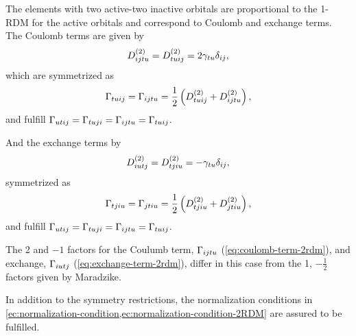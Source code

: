 The elements with two active-two inactive orbitals are proportional to the
1-RDM for the active orbitals and correspond to Coulomb and exchange terms.
The Coulomb terms are given by
\begin{equation} \label{eq:coulomb-term-2rdm}
    D^{\left( 2 \right)}_{ijtu} = D^{\left( 2 \right)}_{tuij} = 2 \gamma_{tu} \delta_{ij},
\end{equation}
which are symmetrized as 
\begin{equation}
    \Gamma_{tuij} = \Gamma_{ijtu} =
    \frac{1}{2} \left( D^{\left( 2 \right)}_{tuij} + D^{\left( 2 \right)}_{ijtu} \right)
    ,
\end{equation}
and fulfill
$\Gamma_{utij} = \Gamma_{tuji} = \Gamma_{ijtu} = \Gamma_{tuij}$.

And the exchange terms by
\begin{equation} \label{eq:exchange-term-2rdm}
    D^{\left( 2 \right)}_{iutj} = D^{\left( 2 \right)}_{tjiu} = - \gamma_{tu} \delta_{ij}
    ,
\end{equation}
symmetrized as
\begin{equation}
    \Gamma_{tjiu} = \Gamma_{jtiu} =
    \frac{1}{2} \left( D^{\left( 2 \right)}_{tjiu} + D^{\left( 2 \right)}_{jtiu} \right)
    ,
\end{equation}
and fulfill
$\Gamma_{utij} = \Gamma_{tuji} = \Gamma_{ijtu} = \Gamma_{tuij}$.

The 2 and $-1$ factors for the Coulumb term, $\Gamma_{ijtu}$ (\cref{eq:coulomb-term-2rdm}),
and exchange, $\Gamma_{iutj}$ (\cref{eq:exchange-term-2rdm}), differ in this
case from the 1, $-\frac{1}{2}$ factors given by Maradzike.

In addition to the symmetry restrictions, the normalization conditions in
\cref{ec:normalization-condition,ec:normalization-condition-2RDM} are assured
to be fulfilled.
